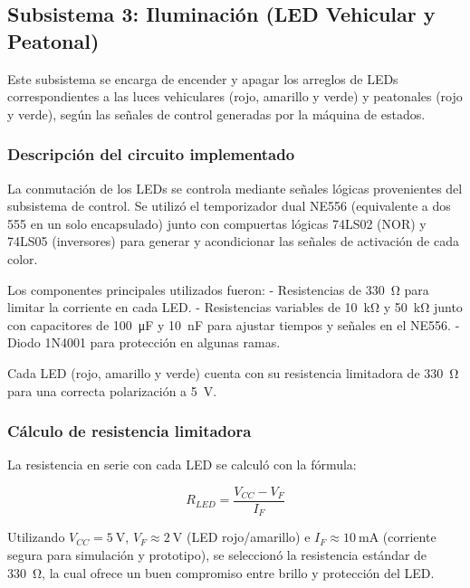\documentclass[10pt,onecolumn]{IEEEtran}
\begin{document}
\subsection{Subsistema 3: Iluminación (LED Vehicular y Peatonal)}
\label{subsec:leds}

Este subsistema se encarga de encender y apagar los arreglos de LEDs correspondientes a las luces vehiculares (rojo, amarillo y verde) y peatonales (rojo y verde), según las señales de control generadas por la máquina de estados.

\subsubsection{Descripción del circuito implementado}

La conmutación de los LEDs se controla mediante señales lógicas provenientes del subsistema de control. Se utilizó el temporizador dual NE556 (equivalente a dos 555 en un solo encapsulado) junto con compuertas lógicas 74LS02 (NOR) y 74LS05 (inversores) para generar y acondicionar las señales de activación de cada color.

Los componentes principales utilizados fueron:
- Resistencias de \SI{330}{\ohm} para limitar la corriente en cada LED.
- Resistencias variables de \SI{10}{\kilo\ohm} y \SI{50}{\kilo\ohm} junto con capacitores de \SI{100}{\micro\farad} y \SI{10}{\nano\farad} para ajustar tiempos y señales en el NE556.
- Diodo 1N4001 para protección en algunas ramas.

Cada LED (rojo, amarillo y verde) cuenta con su resistencia limitadora de \SI{330}{\ohm} para una correcta polarización a \SI{5}{\volt}.

\subsubsection{Cálculo de resistencia limitadora}

La resistencia en serie con cada LED se calculó con la fórmula:

\begin{equation}
R_{LED} = \frac{V_{CC} - V_F}{I_F}
\end{equation}

Utilizando $V_{CC} = \SI{5}{\volt}$, $V_F \approx \SI{2}{\volt}$ (LED rojo/amarillo) e $I_F \approx \SI{10}{\milli\ampere}$ (corriente segura para simulación y prototipo), se seleccionó la resistencia estándar de \SI{330}{\ohm}, la cual ofrece un buen compromiso entre brillo y protección del LED.
\end{document}

